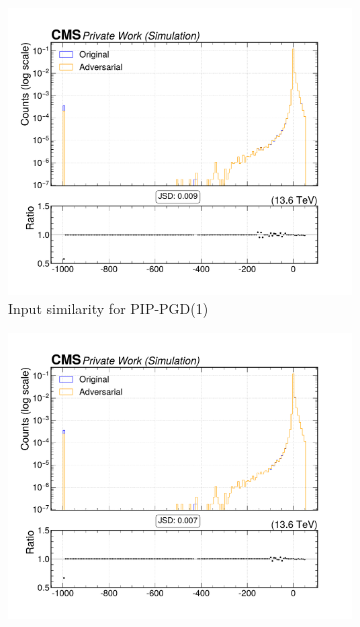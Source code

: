 \begin{figure}[htbp]
  \centering
  \begin{subfigure}[t]{0.32\textwidth}
    \includegraphics[width=\linewidth]{media/output/features/compare/combined_it_1/cmp_global_features_TagVarCSV_trackSip3dSigAboveCharm.pdf}
    \caption*{Input similarity for PIP-PGD(1)}
  \end{subfigure}\hfill
  \begin{subfigure}[t]{0.32\textwidth}
    \includegraphics[width=\linewidth]{media/output/features/compare/combined_it_2/cmp_global_features_TagVarCSV_trackSip3dSigAboveCharm.pdf}

\end{subfigure}
\end{figure}

